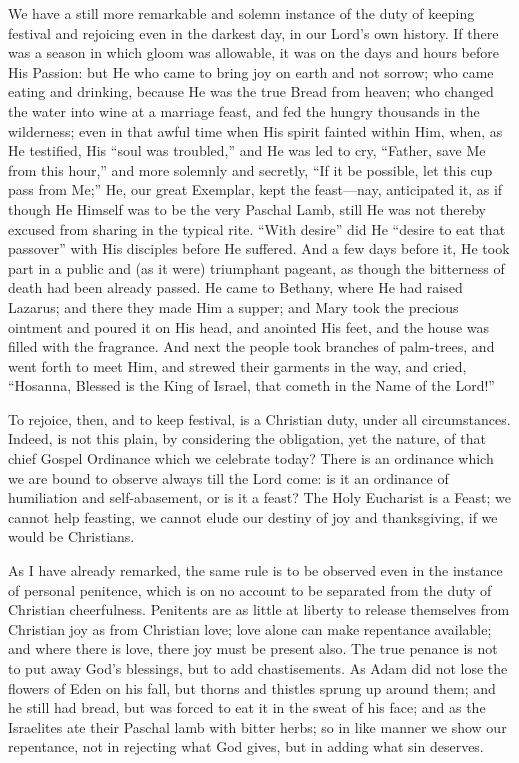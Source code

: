 We have a still more remarkable and solemn instance of the duty of
keeping festival and rejoicing even in the darkest day, in our Lord's
own history. If there was a season in which gloom was allowable, it
was on the days and hours before His Passion: but He who came to bring
joy on earth and not sorrow; who came eating and drinking, because He
was the true Bread from heaven; who changed the water into wine at a
marriage feast, and fed the hungry thousands in the wilderness; even
in that awful time when His spirit fainted within Him, when, as He
testified, His ``soul was troubled,'' and He was led to cry,
``Father, save Me from this hour,'' and more solemnly and
secretly, ``If it be possible, let this cup pass from Me;''
He, our great Exemplar, kept the feast—nay, anticipated it, as if
though He Himself was to be the very Paschal Lamb, still He was not
thereby excused from sharing in the typical rite. ``With
desire'' did He ``desire to eat that passover'' with His
disciples before He suffered. And a few days before it, He took part
in a public and (as it were) triumphant pageant, as though the
bitterness of death had been already passed. He came to Bethany, where
He had raised Lazarus; and there they made Him a supper; and Mary took
the precious ointment and poured it on His head, and anointed His
feet, and the house was filled with the fragrance. And next the people
took branches of palm-trees, and went forth to meet Him, and strewed
their garments in the way, and cried, ``Hosanna, Blessed is the
King of Israel, that cometh in the Name of the Lord!''

To rejoice, then, and to keep festival, is a Christian duty, under
all circumstances. Indeed, is not this plain, by considering the
obligation, yet the nature, of that chief Gospel Ordinance which we
celebrate today? There is an ordinance which we are bound to observe
always till the Lord come: is it an ordinance of humiliation and
self-abasement, or is it a feast? The Holy Eucharist is a Feast; we
cannot help feasting, we cannot elude our destiny of joy and
thanksgiving, if we would be Christians.

As I have already remarked, the same rule is to be observed even in
the instance of personal penitence, which is on no account to be
separated from the duty of Christian cheerfulness. Penitents are as
little at liberty to release themselves from Christian joy as from
Christian love; love alone can make repentance available; and where
there is love, there joy must be present also. The true penance is not
to put away God's blessings, but to add chastisements. As Adam did not
lose the flowers of Eden on his fall, but thorns and thistles sprung
up around them; and he still had bread, but was forced to eat it in
the sweat of his face; and as the Israelites ate their Paschal lamb
with bitter herbs; so in like manner we show our repentance, not in
rejecting what God gives, but in adding what sin deserves.

